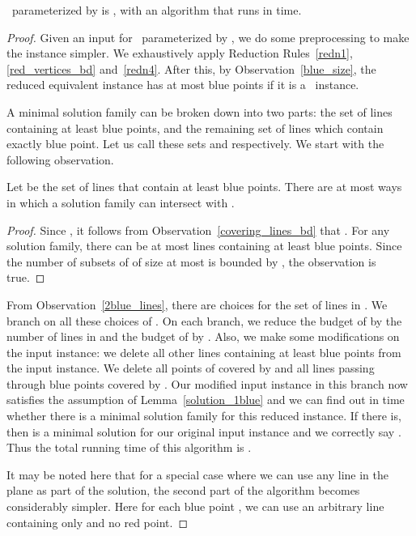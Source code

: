 \begin{theorem}
\label{thm:colour_coding}
 \slrbsc\ parameterized by  is \FPT, with an algorithm that runs in  time.
\end{theorem}
\begin{proof}
Given an input  for \slrbsc\ parameterized by , we do some preprocessing to make the instance simpler. We exhaustively apply Reduction Rules~\ref{redn1}, \ref{red_vertices_bd} and~\ref{redn4}. After this, by Observation~\ref{blue_size}, the reduced equivalent instance has at most  blue points  if it is a \YES\ instance.

A minimal solution family can be broken down into two parts:  the set of lines containing at least  blue points, and the remaining set of lines which contain exactly  blue point.  Let us call these sets  and  respectively. We start with the following observation. 

\begin{observation}\label{2blue_lines}
 Let  be the set of lines that contain at least  blue points. There are at most  ways in which a solution family can intersect with .
\end{observation}
\begin{proof}
 Since , it follows from Observation~\ref{covering_lines_bd} that . For any solution family, there can be at most  lines containing at least  blue points. Since the number of subsets of  of size at most  is bounded by , the observation is true.
\end{proof}

 From Observation~\ref{2blue_lines}, there are  choices for the set of lines in . We branch on all these choices of . On each branch, we reduce the budget of  by the number of lines in  and the budget of  by . Also, we make some modifications on the input instance: we delete all other lines containing at least  blue points from the input instance. We delete all points of  covered by  and all lines passing through blue points covered by . Our modified input instance in this branch now satisfies the assumption of Lemma~\ref{solution_1blue} and we can find out in  time whether there is a minimal solution family  for this reduced instance. If there is, then  is a minimal solution for our original input instance and we correctly say \YES.
Thus the total running time of this algorithm is . 

It  may be noted here that for a special case where we can use any line in the plane as part of the solution, the second part of the algorithm becomes considerably simpler. Here for each blue point , we can use an arbitrary line containing only  and no red point.
 \end{proof} 
 





